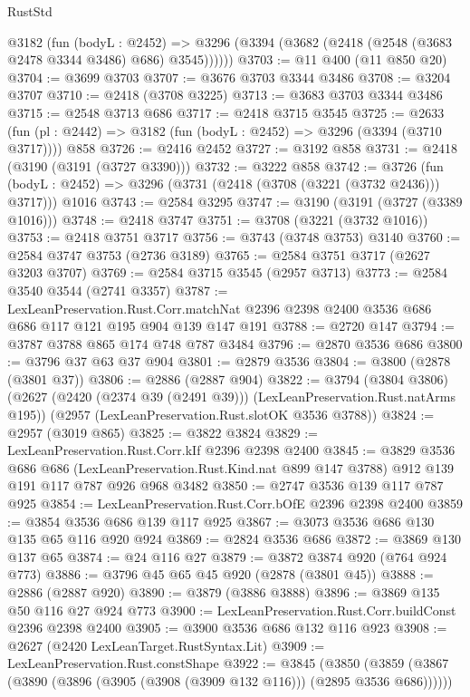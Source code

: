 \begin{lexlean}{RustStd}
\begin{coremodule}
      @3182
        (fun (bodyL : @2452) =>
        @3296 (@3394 (@3682 (@2418 (@2548 (@3683 @2478 @3344 @3486) @686) @3545))))))
@3703 := @11 @400 (@11 @850 @20)
@3704 := @3699 @3703
@3707 := @3676 @3703 @3344 @3486
@3708 := @3204 @3707
@3710 := @2418 (@3708 @3225)
@3713 := @3683 @3703 @3344 @3486
@3715 := @2548 @3713 @686
@3717 := @2418 @3715 @3545
@3725 := @2633 (fun (pl : @2442) => @3182 (fun (bodyL : @2452) => @3296 (@3394 (@3710 @3717)))) @858
@3726 := @2416 @2452
@3727 := @3192 @858
@3731 := @2418 (@3190 (@3191 (@3727 @3390)))
@3732 := @3222 @858
@3742 := @3726
    (fun (bodyL : @2452) => @3296 (@3731 (@2418 (@3708 (@3221 (@3732 @2436))) @3717)))
    @1016
@3743 := @2584 @3295
@3747 := @3190 (@3191 (@3727 (@3389 @1016)))
@3748 := @2418 @3747
@3751 := @3708 (@3221 (@3732 @1016))
@3753 := @2418 @3751 @3717
@3756 := @3743 (@3748 @3753) @3140
@3760 := @2584 @3747 @3753 (@2736 @3189)
@3765 := @2584 @3751 @3717 (@2627 @3203 @3707)
@3769 := @2584 @3715 @3545 (@2957 @3713)
@3773 := @2584 @3540 @3544 (@2741 @3357)
@3787 := LexLeanPreservation.Rust.Corr.matchNat
    @2396
    @2398
    @2400
    @3536
    @686
    @686
    @117
    @121
    @195
    @904
    @139
    @147
    @191
@3788 := @2720 @147
@3794 := @3787 @3788 @865 @174 @748 @787 @3484
@3796 := @2870 @3536 @686
@3800 := @3796 @37 @63 @37 @904
@3801 := @2879 @3536
@3804 := @3800 (@2878 (@3801 @37))
@3806 := @2886 (@2887 @904)
@3822 := @3794
    (@3804 @3806)
    (@2627 (@2420 (@2374 @39 (@2491 @39))) (LexLeanPreservation.Rust.natArms @195))
    (@2957 (LexLeanPreservation.Rust.slotOK @3536 @3788))
@3824 := @2957 (@3019 @865)
@3825 := @3822 @3824
@3829 := LexLeanPreservation.Rust.Corr.kIf @2396 @2398 @2400
@3845 := @3829
    @3536
    @686
    @686
    (LexLeanPreservation.Rust.Kind.nat @899 @147 @3788)
    @912
    @139
    @191
    @117
    @787
    @926
    @968
    @3482
@3850 := @2747 @3536 @139 @117 @787 @925
@3854 := LexLeanPreservation.Rust.Corr.bOfE @2396 @2398 @2400
@3859 := @3854 @3536 @686 @139 @117 @925
@3867 := @3073 @3536 @686 @130 @135 @65 @116 @920 @924
@3869 := @2824 @3536 @686
@3872 := @3869 @130 @137 @65
@3874 := @24 @116 @27
@3879 := @3872 @3874 @920 (@764 @924 @773)
@3886 := @3796 @45 @65 @45 @920 (@2878 (@3801 @45))
@3888 := @2886 (@2887 @920)
@3890 := @3879 (@3886 @3888)
@3896 := @3869 @135 @50 @116 @27 @924 @773
@3900 := LexLeanPreservation.Rust.Corr.buildConst @2396 @2398 @2400
@3905 := @3900 @3536 @686 @132 @116 @923
@3908 := @2627 (@2420 LexLeanTarget.RustSyntax.Lit)
@3909 := LexLeanPreservation.Rust.constShape
@3922 := @3845
    (@3850 (@3859 (@3867 (@3890 (@3896 (@3905 (@3908 (@3909 @132 @116))) (@2895 @3536 @686))))))

\end{coremodule}
\end{lexlean}
